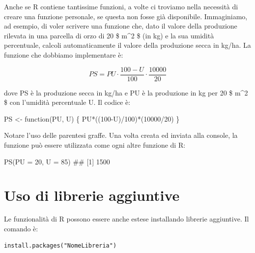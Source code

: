 \documentclass[a4paper,12pt,oneside]{book}
\newenvironment{Shaded}{\begin{snugshade}}{\end{snugshade}}
\newcommand{\DecValTok}[1]{#1}
\newcommand{\SpecialCharTok}[1]{#1}
\newcommand{\DocumentationTok}[1]{#1}
\newcommand{\OtherTok}[1]{#1}
\newcommand{\FunctionTok}[1]{#1}
\newcommand{\ControlFlowTok}[1]{#1}
\newcommand{\AttributeTok}[1]{#1}
\newcommand{\NormalTok}[1]{#1}
\begin{document}
Anche se R contiene tantissime funzioni, a volte ci troviamo nella necessità di creare una funzione personale, se questa non fosse già disponibile. Immaginiamo, ad esempio, di voler scrivere una funzione che, dato il valore della produzione rilevata in una parcella di orzo di 20 \$ m\^{}2 \$ (in kg) e la sua umidità percentuale, calcoli automaticamente il valore della produzione secca in kg/ha. La funzione che dobbiamo implementare è:

\[ PS = PU \cdot \frac{100 - U}{100} \cdot \frac{10000}{20}\]

dove PS è la produzione secca in kg/ha e PU è la produzione in kg per 20 \$ m\^{}2 \$ con l'umidità percentuale U. Il codice è:

\begin{Shaded}
\begin{Highlighting}[]
\NormalTok{PS  }\OtherTok{\textless{}{-}}  \ControlFlowTok{function}\NormalTok{(PU, U) \{}
\NormalTok{  PU}\SpecialCharTok{*}\NormalTok{((}\DecValTok{100}\SpecialCharTok{{-}}\NormalTok{U)}\SpecialCharTok{/}\DecValTok{100}\NormalTok{)}\SpecialCharTok{*}\NormalTok{(}\DecValTok{10000}\SpecialCharTok{/}\DecValTok{20}\NormalTok{)}
\NormalTok{\}}
\end{Highlighting}
\end{Shaded}

Notare l'uso delle parentesi graffe. Una volta creata ed inviata alla console, la funzione può essere utilizzata come ogni altre funzione di R:

\begin{Shaded}
\begin{Highlighting}[]
\FunctionTok{PS}\NormalTok{(}\AttributeTok{PU =} \DecValTok{20}\NormalTok{, }\AttributeTok{U =} \DecValTok{85}\NormalTok{)}
\DocumentationTok{\#\# [1] 1500}
\end{Highlighting}
\end{Shaded}

\hypertarget{uso-di-librerie-aggiuntive}{%
\section{Uso di librerie aggiuntive}\label{uso-di-librerie-aggiuntive}}

Le funzionalità di R possono essere anche estese installando librerie aggiuntive. Il comando è:

\begin{verbatim}
install.packages("NomeLibreria")
\end{verbatim}
\end{document}
